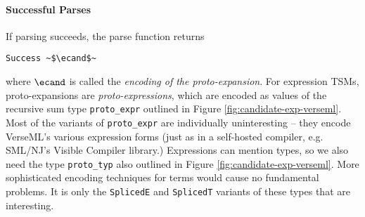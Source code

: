\documentclass[acmlarge,review,anonymous]{acmart}\settopmatter{printfolios=true}
\newcommand{\li}[1]{\lstinline{#1}}
\begin{document}


\paragraph{Successful Parses} If parsing succeeds, the parse function returns 
\begin{lstlisting}[numbers=none]
  Success ~$\ecand$~
\end{lstlisting} 
where $\ecand$ is called the \emph{encoding of the proto-expansion}. For expression TSMs, proto-expansions are \emph{proto-expressions}, which are encoded as values of the recursive sum type \lstinline{proto_expr} outlined in Figure \ref{fig:candidate-exp-verseml}.
Most of the variants of \li{proto_expr} are individually uninteresting -- they encode VerseML's various expression forms (just as in a self-hosted compiler, e.g. SML/NJ's Visible Compiler library.) 
Expressions can mention types, so we also need the type \li{proto_typ} also outlined in Figure \ref{fig:candidate-exp-verseml}. More sophisticated encoding techniques for terms would cause no fundamental problems. It is only the \li{SplicedE} and \li{SplicedT} variants of these types that are interesting.





\end{document}
